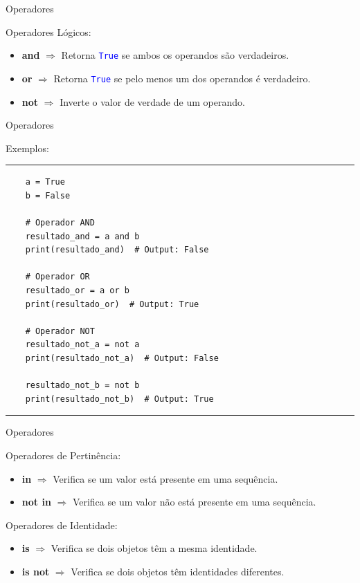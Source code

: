 \documentclass{beamer}
\begin{document}
\begin{frame}[fragile]{Operadores}
	
	\label{operadores_logicos}
	Operadores Lógicos:
	
	\begin{itemize}
	    \item \textbf{and} $\Rightarrow$ Retorna \texttt{\textcolor{blue}{True}} se ambos os operandos são verdadeiros.
		\item \textbf{or} $\Rightarrow$ Retorna \texttt{\textcolor{blue}{True}}  se pelo menos um dos operandos é verdadeiro.
		\item \textbf{not} $\Rightarrow$ Inverte o valor de verdade de um operando.
	\end{itemize}
	
\end{frame}

\begin{frame}[fragile]{Operadores}
	
	\label{operadores_logicos_exemplos}
	Exemplos:
	
\rule{\textwidth}{1pt}
\scriptsize
\begin{verbatim}
	a = True
	b = False
	
	# Operador AND
	resultado_and = a and b
	print(resultado_and)  # Output: False
	
	# Operador OR
	resultado_or = a or b
	print(resultado_or)  # Output: True
	
	# Operador NOT
	resultado_not_a = not a
	print(resultado_not_a)  # Output: False
	
	resultado_not_b = not b
	print(resultado_not_b)  # Output: True

\end{verbatim}
\rule{\textwidth}{1pt}

\end{frame}

\begin{frame}[fragile]{Operadores}
	
	\label{operadores_pertinencia}
	Operadores de Pertinência:
	
	\begin{itemize}
	    \item \textbf{in} $\Rightarrow$ Verifica se um valor está presente em uma sequência.
		\item \textbf{not in} $\Rightarrow$ Verifica se um valor não está presente em uma sequência.
	\end{itemize}

	Operadores de Identidade:
	
	\begin{itemize}
		\item \textbf{is} $\Rightarrow$ Verifica se dois objetos têm a mesma identidade.
		\item \textbf{is not} $\Rightarrow$ Verifica se dois objetos têm identidades diferentes.
	\end{itemize}
	
\end{frame}
\end{document}
